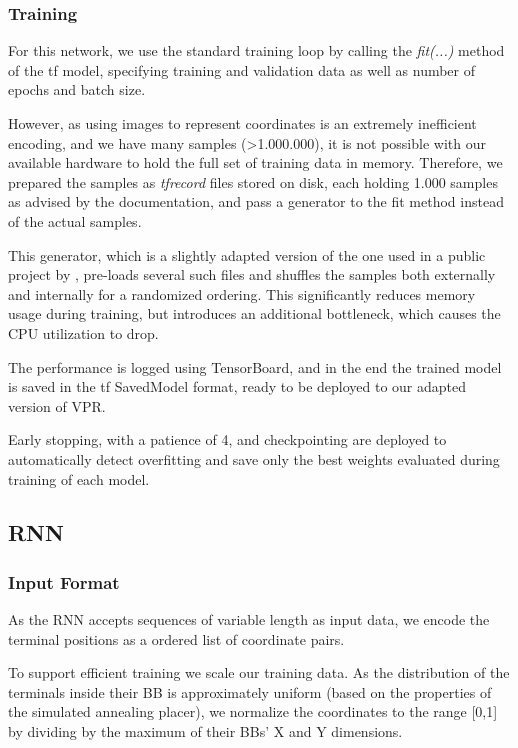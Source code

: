 \subsubsection{Training}

For this network, we use the standard training loop by calling the \textit{fit(...)} method of the \gls{tf} model, specifying training and validation data as well as number of epochs and batch size.

However, as using images to represent coordinates is an extremely inefficient encoding, and we have many samples (>1.000.000)\cite{TODO}, it is not possible with our available hardware to hold the full set of training data in memory. Therefore, we prepared the samples as \textit{tfrecord} files stored on disk, each holding 1.000 samples as advised by the documentation\cite{TODO}, and pass a generator to the fit method instead of the actual samples.

This generator, which is a slightly adapted version of the one used in a public project by \cite{TODO}, pre-loads several such files and shuffles the samples both externally and internally for a randomized ordering. This significantly reduces memory usage during training, but introduces an additional bottleneck, which causes the CPU utilization to drop.

The performance is logged using TensorBoard\cite{TODO}, and in the end the trained model is saved in the \gls{tf} SavedModel format\cite{TODO}, ready to be deployed to our adapted version of \gls{VPR}.

Early stopping, with a patience of 4, and checkpointing are deployed to automatically detect overfitting and save only the best weights evaluated during training of each model.

\subsection{\gls{RNN}}

\subsubsection{Input Format}

As the \gls{RNN} accepts sequences of variable length as input data, we encode the terminal positions as a ordered list of coordinate pairs.

To support efficient training we scale our training data. As the distribution of the terminals inside their \gls{BB} is approximately uniform (based on the properties of the simulated annealing placer), we normalize the coordinates to the range [0,1] by dividing by the maximum of their \glspl{BB}' X and Y dimensions. 

